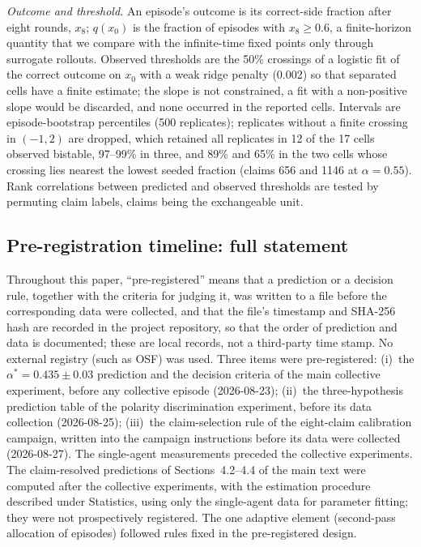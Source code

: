 \documentclass[11pt]{article}
\newcommand{\astar}{\alpha^{*}}
\begin{document}
\emph{Outcome and threshold.} An episode's outcome is its correct-side
fraction after eight rounds, $x_8$; $q(x_0)$ is the fraction of episodes with
$x_8 \ge 0.6$, a finite-horizon quantity that we compare with the
infinite-time fixed points only through surrogate rollouts. Observed
thresholds are the 50\% crossings of a logistic fit of the correct outcome on
$x_0$ with a weak ridge penalty (0.002) so that separated cells have a
finite estimate; the slope is not constrained, a fit with a non-positive slope
would be discarded, and none occurred in the reported cells. Intervals are
episode-bootstrap percentiles (500 replicates); replicates without a finite
crossing in $(-1, 2)$ are dropped, which retained all replicates in 12 of the
17 cells observed bistable, 97--99\% in three, and 89\% and 65\% in the two
cells whose crossing lies nearest the lowest seeded fraction (claims 656 and
1146 at $\alpha = 0.55$). Rank correlations between predicted and observed thresholds are
tested by permuting claim labels, claims being the exchangeable unit.

\subsection{Pre-registration timeline: full statement}

Throughout this paper, ``pre-registered'' means that a prediction or a
decision rule, together with the criteria for judging it, was written to a
file before the corresponding data were collected, and that the file's
timestamp and SHA-256 hash are recorded in the project repository, so that
the order of prediction and data is documented; these are local records, not
a third-party time stamp. No external registry (such as OSF) was used. Three items were
pre-registered: (i)~the $\astar = 0.435 \pm 0.03$ prediction and the decision
criteria of the main collective experiment, before any collective episode
(2026-08-23); (ii)~the three-hypothesis prediction table of the polarity
discrimination experiment, before its data collection (2026-08-25);
(iii)~the claim-selection rule of the eight-claim calibration campaign,
written into the campaign instructions before its data were collected
(2026-08-27). The single-agent measurements preceded the collective
experiments. The claim-resolved predictions of
Sections~4.2--4.4 of the main text were computed after the
collective experiments, with the estimation procedure described under
Statistics, using only the single-agent data for parameter fitting; they were
not prospectively registered. The one adaptive element (second-pass allocation of episodes)
followed rules fixed in the pre-registered design.
\end{document}
